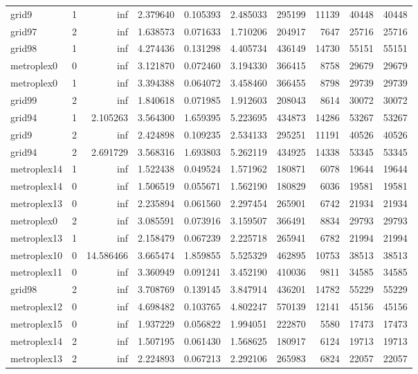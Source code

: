 \begin{longtable}{|l|r|r|r|r|r|r|r|r|r|}
grid9 & 1 & inf & 2.379640 & 0.105393 & 2.485033 & 295199 & 11139 & 40448 & 40448 \\
grid97 & 2 & inf & 1.638573 & 0.071633 & 1.710206 & 204917 & 7647 & 25716 & 25716 \\
grid98 & 1 & inf & 4.274436 & 0.131298 & 4.405734 & 436149 & 14730 & 55151 & 55151 \\
metroplex0 & 0 & inf & 3.121870 & 0.072460 & 3.194330 & 366415 & 8758 & 29679 & 29679 \\
metroplex0 & 1 & inf & 3.394388 & 0.064072 & 3.458460 & 366455 & 8798 & 29739 & 29739 \\
grid99 & 2 & inf & 1.840618 & 0.071985 & 1.912603 & 208043 & 8614 & 30072 & 30072 \\
grid94 & 1 & 2.105263 & 3.564300 & 1.659395 & 5.223695 & 434873 & 14286 & 53267 & 53267 \\
grid9 & 2 & inf & 2.424898 & 0.109235 & 2.534133 & 295251 & 11191 & 40526 & 40526 \\
grid94 & 2 & 2.691729 & 3.568316 & 1.693803 & 5.262119 & 434925 & 14338 & 53345 & 53345 \\
metroplex14 & 1 & inf & 1.522438 & 0.049524 & 1.571962 & 180871 & 6078 & 19644 & 19644 \\
metroplex14 & 0 & inf & 1.506519 & 0.055671 & 1.562190 & 180829 & 6036 & 19581 & 19581 \\
metroplex13 & 0 & inf & 2.235894 & 0.061560 & 2.297454 & 265901 & 6742 & 21934 & 21934 \\
metroplex0 & 2 & inf & 3.085591 & 0.073916 & 3.159507 & 366491 & 8834 & 29793 & 29793 \\
metroplex13 & 1 & inf & 2.158479 & 0.067239 & 2.225718 & 265941 & 6782 & 21994 & 21994 \\
metroplex10 & 0 & 14.586466 & 3.665474 & 1.859855 & 5.525329 & 462895 & 10753 & 38513 & 38513 \\
metroplex11 & 0 & inf & 3.360949 & 0.091241 & 3.452190 & 410036 & 9811 & 34585 & 34585 \\
grid98 & 2 & inf & 3.708769 & 0.139145 & 3.847914 & 436201 & 14782 & 55229 & 55229 \\
metroplex12 & 0 & inf & 4.698482 & 0.103765 & 4.802247 & 570139 & 12141 & 45156 & 45156 \\
metroplex15 & 0 & inf & 1.937229 & 0.056822 & 1.994051 & 222870 & 5580 & 17473 & 17473 \\
metroplex14 & 2 & inf & 1.507195 & 0.061430 & 1.568625 & 180917 & 6124 & 19713 & 19713 \\
metroplex13 & 2 & inf & 2.224893 & 0.067213 & 2.292106 & 265983 & 6824 & 22057 & 22057 \\

\end{longtable}
